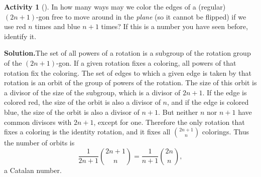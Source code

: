 \documentclass[10pt,]{book}
\theoremstyle{plain}
\theoremstyle{definition}
\newtheorem{activity}[project]{Activity}
\numberwithin{equation}{chapter}
\begin{document}
\begin{activity}[]\label{Catalancircle}
In how many ways may we color the edges of a (regular) \((2n+1)\)-gon free to move around in the \emph{plane} (so it cannot be flipped) if we use red \(n\) times and blue \(n+1\) times? If this is a number you have seen before, identify it. %
\par\medskip\noindent%
\textbf{Solution.}\quad The set of all powers of a rotation is a subgroup of the rotation group of the \((2n+1)\)-gon. If a given rotation fixes a coloring, all powers of that rotation fix the coloring. The set of edges to which a given edge is taken by that rotation is an orbit of the group of powers of the rotation. The size of this orbit is a divisor of the size of the subgroup, which is a divisor of \(2n+1\). If the edge is colored red, the size of the orbit is also a divisor of \(n\), and if the edge is colored blue, the size of the orbit is also a divisor of \(n+1\). But neither \(n\) nor \(n+1\) have common divisors with \(2n+1\), except for one. Therefore the only rotation that fixes a coloring is the identity rotation, and it fixes all \(\binom{2n+1}{n}\) colorings. Thus the number of orbits is%
\begin{equation*}
\frac{1}{2n+1}\binom{2n+1 }{n} = \frac{1}{n+1}\binom{2n}{n},
\end{equation*}
a Catalan number.%
\end{activity}
\end{document}
